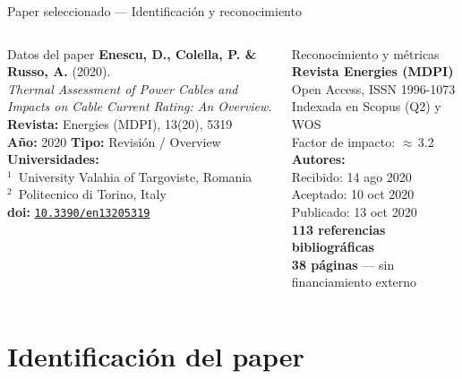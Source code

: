 \documentclass[aspectratio=169]{beamer}
\begin{document}
\begin{frame}{Paper seleccionado --- Identificación y reconocimiento}
  \begin{columns}[T]
      \begin{block}{Datos del paper}
        \small
        \textbf{Enescu, D., Colella, P. \& Russo, A.} (2020).\\[2pt]
        \textit{Thermal Assessment of Power Cables and Impacts
        on Cable Current Rating: An Overview.}\\[4pt]
        \textbf{Revista:} Energies (MDPI), 13(20), 5319\\[2pt]
        \textbf{Año:} 2020 \quad
        \textbf{Tipo:} Revisión / Overview\\[2pt]
        \textbf{Universidades:}\\[1pt]
        $^1$~University Valahia of Targoviste, Romania\\[1pt]
        $^2$~Politecnico di Torino, Italy\\[2pt]
        \textbf{doi:}
        \href{https://doi.org/10.3390/en13205319}
             {\texttt{10.3390/en13205319}}
      \end{block}
      \begin{exampleblock}{Reconocimiento y métricas}
        \small
        \textbf{Revista Energies (MDPI)}\\[2pt]
        Open Access, ISSN 1996-1073\\[2pt]
        Indexada en Scopus (Q2) y WOS\\[2pt]
        Factor de impacto: $\approx$\,3.2\\[4pt]
        \textbf{Autores:}\\[1pt]
        Recibido: 14 ago 2020\\[1pt]
        Aceptado: 10 oct 2020\\[1pt]
        Publicado: 13 oct 2020\\[4pt]
        \textbf{113 referencias bibliográficas}\\[1pt]
        \textbf{38 páginas} --- sin financiamiento externo
      \end{exampleblock}
  \end{columns}
\end{frame}

\section{Identificación del paper}
\end{document}
